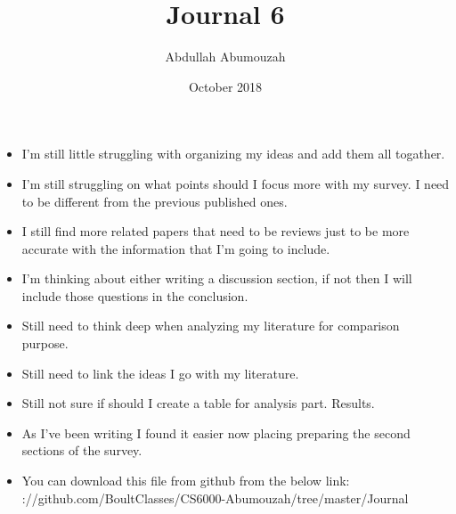 \documentclass{article}
\title{Journal 6}
\author{Abdullah Abumouzah }
\date{October 2018}
\begin{document}
\maketitle
\begin{itemize}
    \item I'm still little struggling with organizing my ideas and add them all togather.
    \item I'm still struggling on what points should I focus more with my survey. I need to be different from the previous published ones. 
    \item I still find more related papers that need to be reviews just to be more accurate with the information that I'm going to include. 
    \item I'm thinking about either writing a discussion section, if not then I will include those questions in the conclusion.
    \item Still need to think deep when analyzing my literature for comparison purpose.
    \item Still need to link the ideas I go with my literature.
    \item Still not sure if should I create a table for analysis part. Results.
    \item As I've been writing I found it easier now placing preparing the second sections of the survey.
    
    \item You can download this file from github from the below link: \urlhttps://github.com/BoultClasses/CS6000-Abumouzah/tree/master/Journal%
    
    
\end{itemize}
\end{document}

